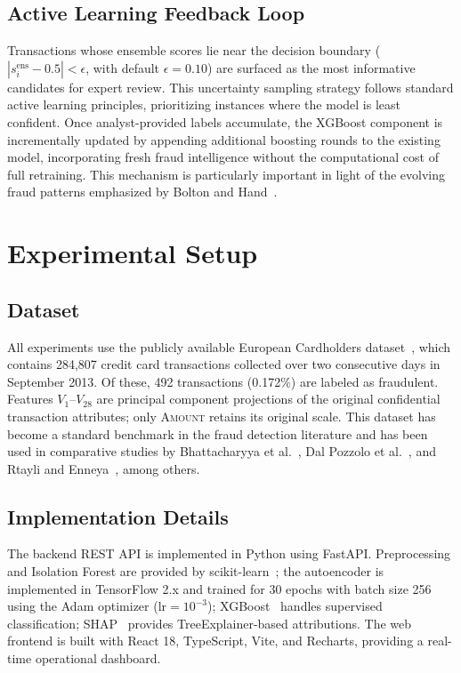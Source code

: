 \documentclass[conference,10pt]{IEEEtran}
\begin{document}
\subsection{Active Learning Feedback Loop}
Transactions whose ensemble scores lie near the decision boundary ($|s_i^{\text{ens}} - 0.5| < \epsilon$, with default $\epsilon = 0.10$) are surfaced as the most informative candidates for expert review. This uncertainty sampling strategy follows standard active learning principles, prioritizing instances where the model is least confident. Once analyst-provided labels accumulate, the XGBoost component is incrementally updated by appending additional boosting rounds to the existing model, incorporating fresh fraud intelligence without the computational cost of full retraining. This mechanism is particularly important in light of the evolving fraud patterns emphasized by Bolton and Hand~\cite{bolton2002statistical}.

\section{Experimental Setup}

\subsection{Dataset}
All experiments use the publicly available European Cardholders dataset~\cite{dal2014learned}, which contains 284,807 credit card transactions collected over two consecutive days in September 2013. Of these, 492 transactions (0.172\%) are labeled as fraudulent. Features $V_1$--$V_{28}$ are principal component projections of the original confidential transaction attributes; only \textsc{Amount} retains its original scale. This dataset has become a standard benchmark in the fraud detection literature and has been used in comparative studies by Bhattacharyya et al.~\cite{bhattacharyya2011data}, Dal Pozzolo et al.~\cite{dal2014learned}, and Rtayli and Enneya~\cite{rtayli2020enhanced}, among others.

\subsection{Implementation Details}
The backend REST API is implemented in Python using FastAPI. Preprocessing and Isolation Forest are provided by scikit-learn~\cite{scikit-learn}; the autoencoder is implemented in TensorFlow 2.x and trained for 30 epochs with batch size 256 using the Adam optimizer ($\text{lr}=10^{-3}$); XGBoost~\cite{chen2016xgboost} handles supervised classification; SHAP~\cite{lundberg2017unified} provides TreeExplainer-based attributions. The web frontend is built with React 18, TypeScript, Vite, and Recharts, providing a real-time operational dashboard.
\end{document}
